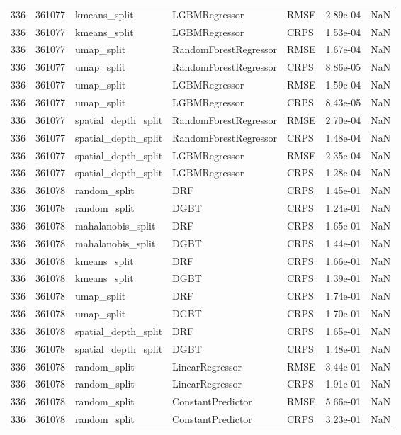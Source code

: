 \begin{tabular}{rrlllrr}
336 & 361077 & kmeans\_split & LGBMRegressor & RMSE & 2.89e-04 & NaN \\
336 & 361077 & kmeans\_split & LGBMRegressor & CRPS & 1.53e-04 & NaN \\
336 & 361077 & umap\_split & RandomForestRegressor & RMSE & 1.67e-04 & NaN \\
336 & 361077 & umap\_split & RandomForestRegressor & CRPS & 8.86e-05 & NaN \\
336 & 361077 & umap\_split & LGBMRegressor & RMSE & 1.59e-04 & NaN \\
336 & 361077 & umap\_split & LGBMRegressor & CRPS & 8.43e-05 & NaN \\
336 & 361077 & spatial\_depth\_split & RandomForestRegressor & RMSE & 2.70e-04 & NaN \\
336 & 361077 & spatial\_depth\_split & RandomForestRegressor & CRPS & 1.48e-04 & NaN \\
336 & 361077 & spatial\_depth\_split & LGBMRegressor & RMSE & 2.35e-04 & NaN \\
336 & 361077 & spatial\_depth\_split & LGBMRegressor & CRPS & 1.28e-04 & NaN \\
336 & 361078 & random\_split & DRF & CRPS & 1.45e-01 & NaN \\
336 & 361078 & random\_split & DGBT & CRPS & 1.24e-01 & NaN \\
336 & 361078 & mahalanobis\_split & DRF & CRPS & 1.65e-01 & NaN \\
336 & 361078 & mahalanobis\_split & DGBT & CRPS & 1.44e-01 & NaN \\
336 & 361078 & kmeans\_split & DRF & CRPS & 1.66e-01 & NaN \\
336 & 361078 & kmeans\_split & DGBT & CRPS & 1.39e-01 & NaN \\
336 & 361078 & umap\_split & DRF & CRPS & 1.74e-01 & NaN \\
336 & 361078 & umap\_split & DGBT & CRPS & 1.70e-01 & NaN \\
336 & 361078 & spatial\_depth\_split & DRF & CRPS & 1.65e-01 & NaN \\
336 & 361078 & spatial\_depth\_split & DGBT & CRPS & 1.48e-01 & NaN \\
336 & 361078 & random\_split & LinearRegressor & RMSE & 3.44e-01 & NaN \\
336 & 361078 & random\_split & LinearRegressor & CRPS & 1.91e-01 & NaN \\
336 & 361078 & random\_split & ConstantPredictor & RMSE & 5.66e-01 & NaN \\
336 & 361078 & random\_split & ConstantPredictor & CRPS & 3.23e-01 & NaN \\

\end{tabular}
